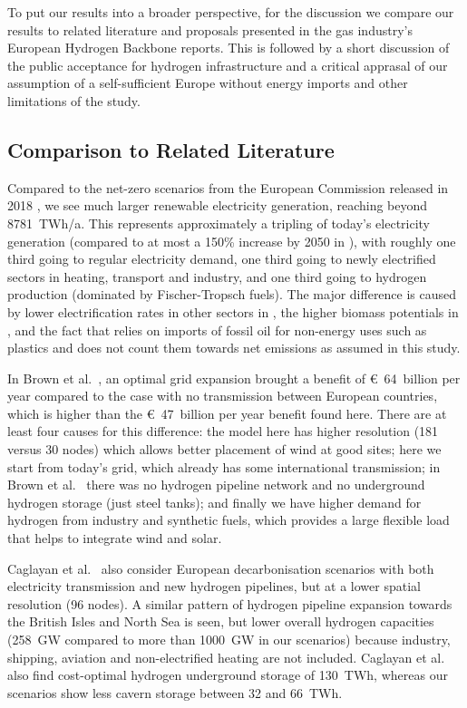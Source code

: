 To put our results into a broader perspective, for the discussion we compare our
results to related literature and proposals presented in the gas industry's
European Hydrogen Backbone reports. This is followed by a short discussion of
the public acceptance for hydrogen infrastructure and a critical apprasal of our
assumption of a self-sufficient Europe without energy imports and other
limitations of the study.

\subsection*{Comparison to Related Literature}

Compared to the net-zero scenarios from the European Commission released in 2018
\cite{in-depth_2018}, we see much larger renewable electricity generation,
reaching beyond 8781~TWh/a. This represents approximately a tripling of today's
electricity generation (compared to at most a 150\% increase by 2050 in
\cite{in-depth_2018}), with roughly one third going to regular electricity
demand, one third going to newly electrified sectors in heating, transport and
industry, and one third going to hydrogen production (dominated by
Fischer-Tropsch fuels). The major difference is caused by lower electrification
rates in other sectors in \cite{in-depth_2018}, the higher biomass potentials in
\cite{in-depth_2018}, and the fact that \cite{in-depth_2018} relies on imports
of fossil oil for non-energy uses such as plastics and does not count them
towards net emissions as assumed in this study.

In Brown et al.~\cite{brownSynergiesSector2018}, an optimal grid expansion
brought a benefit of \euro~64~billion per year compared to the case with no
transmission between European countries, which is higher than the
\euro~47~billion per year benefit found here. There are at least four causes for
this difference: the model here has higher resolution (181 versus 30 nodes)
which allows better placement of wind at good sites; here we start from today's
grid, which already has some international transmission; in Brown et
al.~\cite{brownSynergiesSector2018} there was no hydrogen pipeline network and
no underground hydrogen storage (just steel tanks); and finally we have higher
demand for hydrogen from industry and synthetic fuels, which provides a large
flexible load that helps to integrate wind and solar.

Caglayan et al.~\cite{Caglayan2019} also consider European decarbonisation
scenarios with both electricity transmission and new hydrogen pipelines, but at
a lower spatial resolution (96 nodes). A similar pattern of hydrogen pipeline
expansion towards the British Isles and North Sea is seen, but lower overall
hydrogen capacities (258~GW compared to more than 1000~GW in our scenarios)
because industry, shipping, aviation and non-electrified heating are not
included. Caglayan et al.~\cite{Caglayan2019} also find cost-optimal hydrogen
underground storage of 130~TWh, whereas our scenarios show less cavern storage
between 32 and 66~TWh.

